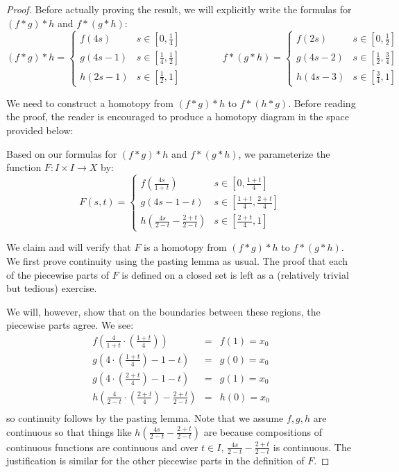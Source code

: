 \begin{proof}
	Before actually proving the result, we will explicitly write the formulas for $(f*g)*h$ and $f*(g*h)$:
	\[(f*g)*h = 
	\begin{cases}
		f(4s) & s\in [0,\frac14] \\
		g(4s-1) & s\in[\frac14,\frac12] \\
		h(2s-1) & s\in [\frac12,1] 
	\end{cases}
	\qquad\qquad f*(g*h) = 
	\begin{cases}
		f(2s) & s\in [0,\frac12] \\
		g(4s-2) & s\in[\frac12,\frac34] \\
		h(4s-3) & s\in [\frac34,1] 
	\end{cases}
	\]
	
	We need to construct a homotopy from $(f*g)*h$ to $f*(h*g)$. Before reading the proof, the reader is encouraged to produce a homotopy diagram in the space provided below: \placeholder
	
	Based on our formulas for $(f*g)*h$ and $f*(g*h)$, we parameterize the function $F:I\times I \to X$ by:
	\[F(s,t) = 
	\begin{cases}
		f\left(\frac{4s}{1+t} \right)& s \in \left[ 0,\frac{1+t}4 \right] \\
		g(4s-1-t) & s\in \left[\frac{1+t}4, \frac{2+t}4\right] \\
		h\left(\frac{4s}{2-t} - \frac{2+t}{2-t} \right) & s\in \left[\frac{2+t}4,1\right] 
	\end{cases}
	\]
	
	We claim and will verify that $F$ is a homotopy from $(f*g)*h$ to $f*(g*h)$. We first prove continuity using the pasting lemma as usual. The proof that each of the piecewise parts of $F$ is defined on a closed set is left as a (relatively trivial but tedious) exercise.
	
	We will, however, show that on the boundaries between these regions, the piecewise parts agree. We see: 
	\begin{eqnarray*}
		f\left(\frac{4}{1+t} \cdot \left(\frac{1+t}4\right)\right) & = & f(1) = x_0 \\
		g\left(4\cdot\left(\frac{1+t}4\right)-1-t\right) & = & g(0) = x_0\\
		g\left(4\cdot\left(\frac{2+t}4\right)-1-t\right) & = & g(1) = x_0\\
		h\left(\frac{4}{2-t} \cdot \left(\frac{2+t}4\right)- \frac{2+t}{2-t}\right) & = & h(0) = x_0\\
	\end{eqnarray*}
	so continuity follows by the pasting lemma. Note that we assume $f,g,h$ are continuous so that things like $h\left(\frac{4s}{2-t} - \frac{2+t}{2-t} \right)$ are because compositions of continuous functions are continuous and over $t\in I$, $\frac{4s}{2-t} - \frac{2+t}{2-t}$ is continuous. The justification is similar for the other piecewise parts in the definition of $F$. 
	

\end{proof}
